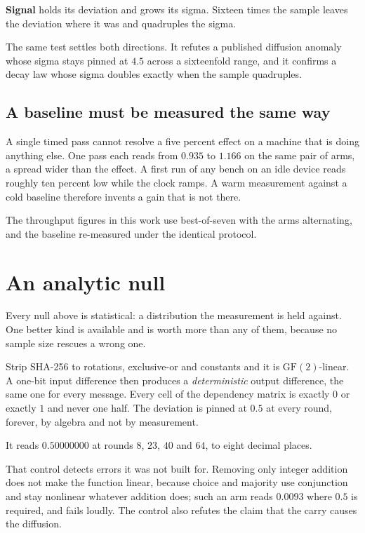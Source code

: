\textbf{Signal} holds its deviation and grows its sigma. Sixteen times the sample leaves the deviation where it was and quadruples the sigma.

The same test settles both directions. It refutes a published diffusion anomaly whose sigma stays pinned at \(4.5\) across a sixteenfold range, and it confirms a decay law whose sigma doubles exactly when the sample quadruples.

\subsection{A baseline must be measured the same way}

A single timed pass cannot resolve a five percent effect on a machine that is doing anything else. One pass each reads from \(0.935\) to \(1.166\) on the same pair of arms, a spread wider than the effect. A first run of any bench on an idle device reads roughly ten percent low while the clock ramps. A warm measurement against a cold baseline therefore invents a gain that is not there.

The throughput figures in this work use best-of-seven with the arms alternating, and the baseline re-measured under the identical protocol.

\section{An analytic null}

Every null above is statistical: a distribution the measurement is held against. One better kind is available and is worth more than any of them, because no sample size rescues a wrong one.

Strip SHA-256 to rotations, exclusive-or and constants and it is \(\mathrm{GF}(2)\)-linear. A one-bit input difference then produces a \emph{deterministic} output difference, the same one for every message. Every cell of the dependency matrix is exactly \(0\) or exactly \(1\) and never one half. The deviation is pinned at \(0.5\) at every round, forever, by algebra and not by measurement.

It reads \(0.50000000\) at rounds \(8\), \(23\), \(40\) and \(64\), to eight decimal places.

That control detects errors it was not built for. Removing only integer addition does not make the function linear, because choice and majority use conjunction and stay nonlinear whatever addition does; such an arm reads \(0.0093\) where \(0.5\) is required, and fails loudly. The control also refutes the claim that the carry causes the diffusion.

